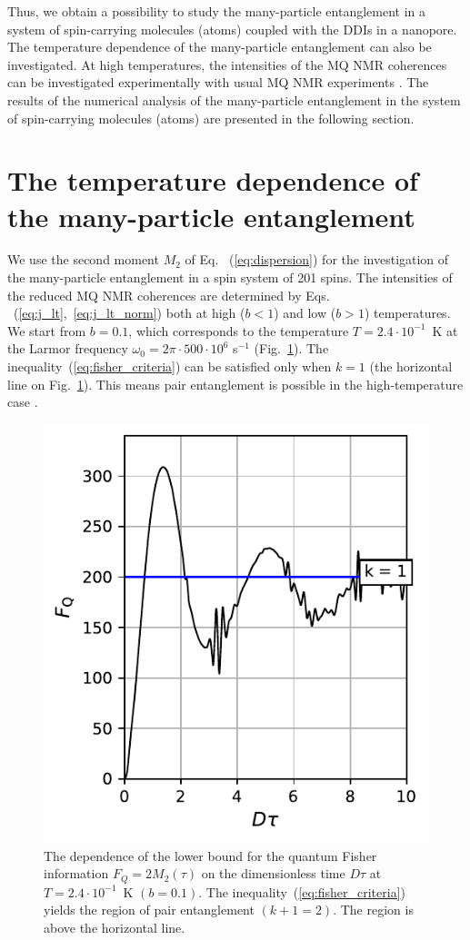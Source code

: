 \documentclass[
    pra,  
    twocolumn, 
    floatfix, 
    amsmath, 
    amssymb, 
    superscriptaddress
]{revtex4-1}
\begin{document}
Thus, we obtain a possibility to study the many-particle entanglement in a system of spin-carrying molecules (atoms) coupled with the DDIs in a nanopore.
The temperature dependence of the many-particle entanglement can also be investigated. 
At high temperatures, the intensities of the MQ NMR coherences can be investigated experimentally with usual MQ NMR experiments \cite{mq_nmr_experiment}. The results of the numerical analysis of the many-particle entanglement in the system of spin-carrying molecules (atoms) are presented in the following section.


\section{The temperature dependence of the many-particle entanglement}
\label{sec:entanglement}
We use  the second moment $M_2$ of Eq. ~(\ref{eq:dispersion}) for the investigation of the many-particle entanglement in a spin system of 201 spins. 
The intensities of the reduced MQ NMR coherences are determined by Eqs.  ~(\ref{eq:j_lt},~\ref{eq:j_lt_norm}) both at high ($b < 1$) and low ($b > 1$) temperatures. 
We start from $b = 0.1$, which corresponds to the temperature ${T= 2.4\cdot 10^{-1}}$~K at the Larmor frequency $\omega_0 = 2\pi\cdot 500\cdot10^6$ s$^{-1}$ (Fig.~\ref{fig:m2_t_b01}). 
The inequality~(\ref{eq:fisher_criteria}) can be satisfied only when $k=1$ (the horizontal line on Fig.~\ref{fig:m2_t_b01}). 
This means pair entanglement is possible in the high-temperature case \cite{lab:mq_mnr_qinfo_2012}. 
\begin{figure}
    \centering
    \includegraphics{m2_t_b01.pdf}
    \caption{The dependence of the lower bound for the quantum Fisher information $F_Q = 2M_2(\tau)$ on the dimensionless time $D\tau$ at ${T=2.4\cdot10^{-1}}$~K $(b=0.1)$. 
    The inequality~(\ref{eq:fisher_criteria}) yields the region of pair entanglement $(k+1=2)$. The region is above the horizontal line. 
    }
    \label{fig:m2_t_b01}
\end{figure}
\end{document}

